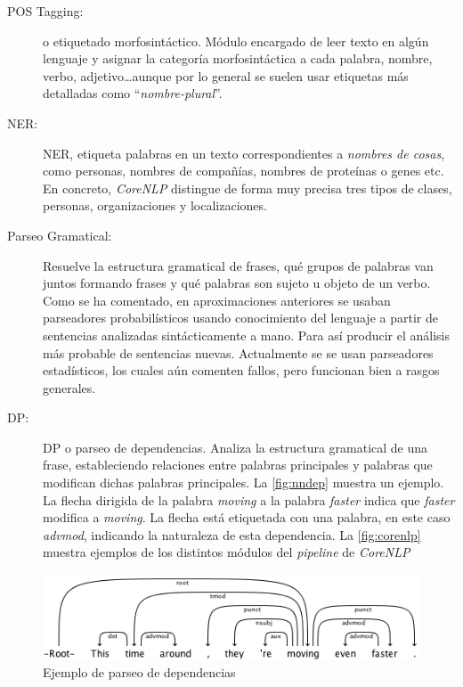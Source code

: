 \begin{description}
  \item[POS Tagging:] o etiquetado morfosintáctico. Módulo encargado de leer
    texto en algún lenguaje y asignar la categoría morfosintáctica a cada
    palabra, \eg nombre, verbo, adjetivo\dots aunque por lo general se suelen
    usar etiquetas más detalladas como ``\emph{nombre-plural}''.
  \item[NER:] \ac{NER}, etiqueta palabras en un texto correspondientes a
    \emph{nombres de cosas}, como personas, nombres de compañías, nombres de
    proteínas o genes etc. En concreto, \emph{CoreNLP} distingue de forma muy
    precisa tres tipos de clases, personas, organizaciones y localizaciones.
  \item[Parseo Gramatical:] Resuelve la estructura gramatical de frases, \eg qué
    grupos de palabras van juntos formando frases y qué palabras son sujeto u
    objeto de un verbo. Como se ha comentado, en aproximaciones anteriores se
    usaban parseadores probabilísticos usando conocimiento del lenguaje a partir
    de sentencias analizadas sintácticamente a mano. Para así producir el
    análisis más probable de sentencias nuevas. Actualmente se se usan
    parseadores estadísticos, los cuales aún comenten fallos, pero funcionan
    bien a rasgos generales.
  \item[DP:] \ac{DP} o parseo de dependencias. Analiza la estructura gramatical
    de una frase, estableciendo relaciones entre palabras principales y palabras
    que modifican dichas palabras principales. La \autoref{fig:nndep} muestra un
    ejemplo. La flecha dirigida de la palabra \emph{moving} a la palabra
    \emph{faster} indica que \emph{faster} modifica a \emph{moving}. La flecha
    está etiquetada con una palabra, en este caso \emph{advmod}, indicando la
    naturaleza de esta dependencia. La \autoref{fig:corenlp} muestra ejemplos de
    los distintos módulos del \emph{pipeline} de \emph{CoreNLP}
\end{description}

\begin{figure}[bth]
  \includegraphics[width=1\linewidth]{gfx/nndep-example}
  \caption[Ejemplo de parseo de dependencias]{Ejemplo de parseo de dependencias}
  \label{fig:nndep}
\end{figure}

